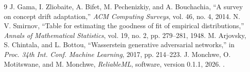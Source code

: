 \documentclass[conference]{IEEEtran}
\begin{document}
\begin{thebibliography}{9}
 J. Gama, I. Zliobaite, A. Bifet, M. Pechenizkiy, and A. Bouchachia, ``A survey on concept drift adaptation,'' \emph{ACM Computing Surveys}, vol. 46, no. 4, 2014.
 N. V. Smirnov, ``Table for estimating the goodness of fit of empirical distributions,'' \emph{Annals of Mathematical Statistics}, vol. 19, no. 2, pp. 279--281, 1948.
 M. Arjovsky, S. Chintala, and L. Bottou, ``Wasserstein generative adversarial networks,'' in \emph{Proc. 34th Int. Conf. Machine Learning}, 2017, pp. 214--223.
 J. Monchwe, O. Motitswane, and M. Monchwe, \emph{ReliableML}, software, version 0.1.1, 2026. \projecturl.
\end{thebibliography}
\end{document}
